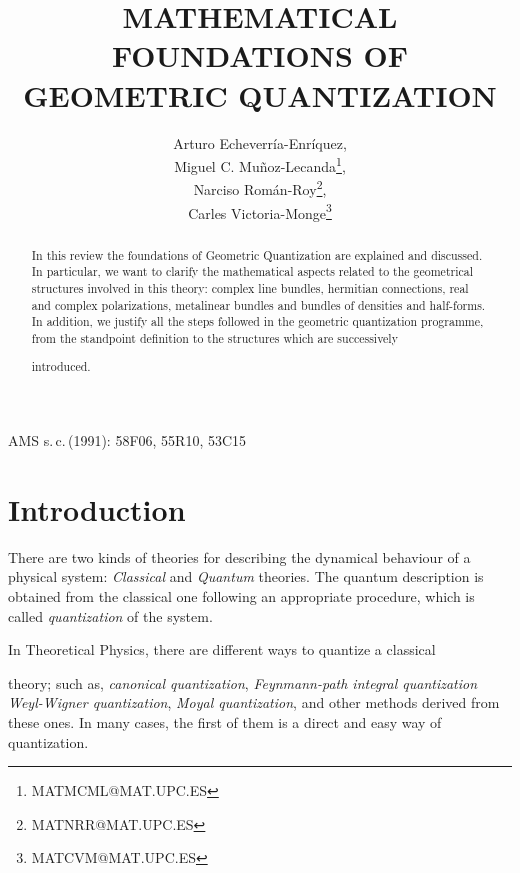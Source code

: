 \documentclass[12pt]{article}
\title{MATHEMATICAL FOUNDATIONS OF GEOMETRIC QUANTIZATION}
\author{\sc Arturo Echeverr\'ia-Enr\'iquez,
   \\
   {\sc Miguel C. Mu\~noz-Lecanda\thanks{MATMCML@MAT.UPC.ES}},
   \\
   {\sc Narciso Rom\'an-Roy\thanks{MATNRR@MAT.UPC.ES}},
   \\
   {\sc Carles Victoria-Monge\thanks{MATCVM@MAT.UPC.ES}}
   \\
   \tabaddress{\UPCMAT}}
\date{ }
\theoremstyle{plain}
\begin{document}
\maketitle


\begin{abstract}
In this review
the foundations of Geometric Quantization are explained and discussed.
In particular, we want to clarify the mathematical aspects related to
the
geometrical structures involved in this theory: complex line bundles,
hermitian connections, real and complex polarizations, metalinear
bundles and
bundles of densities and half-forms.
In addition, we justify all the steps followed in the geometric
quantization programme,
 from the standpoint definition to the structures which are successively

introduced.
\end{abstract}


\vfill \hfill
\vbox{\raggedleft AMS s.\,c.\,(1991): 58F06, 55R10, 53C15}\null

\thispagestyle{empty}
\setcounter{page}{0}


\clearpage
\tableofcontents


\newpage

\section{Introduction}


There are two kinds of theories for describing
the dynamical behaviour of a physical system:
{\it Classical} and {\it Quantum} theories.
The quantum description is obtained from the classical one
following an appropriate procedure, which is called {\it quantization}
of the system.

In Theoretical Physics, there are different ways to quantize a classical

theory;
such as,  {\it canonical quantization}, {\it Feynmann-path integral
quantization}
{\it Weyl-Wigner quantization}, {\it Moyal quantization},
and other methods derived from these ones.
In many cases, the first of them is a direct and easy way of
quantization.
\end{document}
